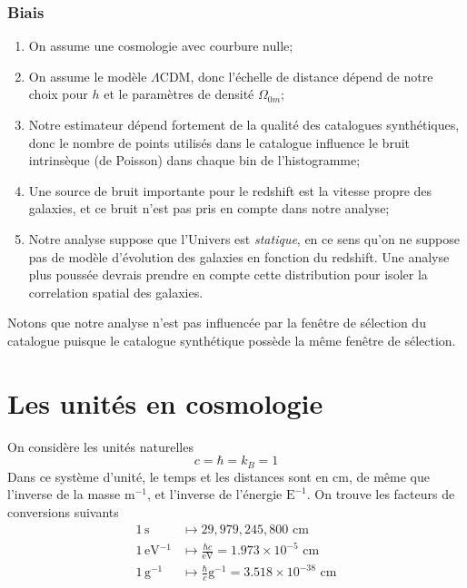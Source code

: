 \documentclass{article}
\numberwithin{equation}{section}
\begin{document}
\subsubsection{Biais}
\begin{enumerate}
        \item On assume une cosmologie avec courbure nulle;
        \item On assume le modèle $\Lambda \text{CDM}$, donc l'échelle de distance dépend de notre choix pour $h$ et 
                le paramètres de densité $\Omega_{0m}$;
        \item Notre estimateur dépend fortement de la qualité des catalogues synthétiques, donc le nombre de points utilisés 
                dans le catalogue influence le bruit intrinsèque (de Poisson) dans chaque bin de l'histogramme;
        \item Une source de bruit importante pour le redshift est la vitesse propre des galaxies, et ce bruit n'est 
                pas pris en compte dans notre analyse;
        \item Notre analyse suppose que l'Univers est \textit{statique}, en ce sens qu'on ne suppose pas de modèle 
                d'évolution des galaxies en fonction du redshift. Une analyse plus poussée devrais prendre en 
                compte cette distribution pour isoler 
                la correlation spatial des galaxies.
\end{enumerate}
Notons que notre analyse n'est pas influencée par la fenêtre de sélection du catalogue puisque le catalogue synthétique 
possède la même fenêtre de sélection.



\section{Les unités en cosmologie}
On considère les unités naturelles
\[
        c = \hbar = k_B = 1
\]
Dans ce système d'unité, le temps et les distances sont en cm, de même que l'inverse de la masse $\text{m}^{-1}$, 
et l'inverse de l'énergie $\text{E}^{-1}$. On trouve les facteurs de conversions suivants
\begin{align*}
        1\, \text{s} &\mapsto  29,979,245,800 \,\, \text{cm} \\
        1\, \si{\electronvolt^{-1}} &\mapsto \frac{\hbar c }{\si{\electronvolt}}= 1.973 \times 10^{-5} \,\, \text{cm} \\
        1\, \text{g}^{-1} &\mapsto \frac{\hbar}{c} \text{g}^{-1} = 3.518 \times 10^{-38} \,\, \text{cm}   
\end{align*}
\end{document}
